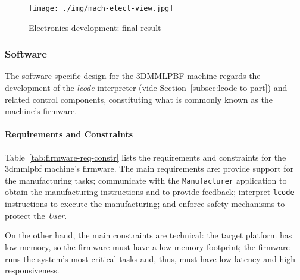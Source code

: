\begin{figure}[!hbt]
  \centering
  \texttt{[image: ./img/mach-elect-view.jpg]}
  \caption{Electronics development: final result}%
  \label{fig:elect-final}
\end{figure}

\subsubsection{Software}%
\label{sec:mach-sw}
The software specific design for the 3DMMLPBF machine regards the development of
the \emph{lcode} interpreter (vide Section~\ref{subsec:lcode-to-part}) and
related control components, constituting what is commonly known as the machine's
firmware.
% 
% 
% 

\paragraph{Requirements and Constraints}
Table~\ref{tab:firmware-req-constr} lists the requirements and constraints for
the \gls{3dmmlpbf} machine's firmware.
The main requirements are: provide support for the manufacturing tasks;
communicate with the \texttt{Manufacturer} application to obtain the
manufacturing instructions and to provide feedback; interpret \texttt{lcode}
instructions to execute the manufacturing; and enforce safety mechanisms to
protect the \emph{User}.

On the other hand, the main constraints are technical: the target platform has
low memory, so the firmware must have a low memory footprint; the firmware runs
the system's most critical tasks and, thus, must have low latency and high responsiveness.

\begin{table}[!hbt]
\centering
\caption{Requirements and contraints for the 3DMMLPBF machine's firmware}
\label{tab:firmware-req-constr}
\end{table}

